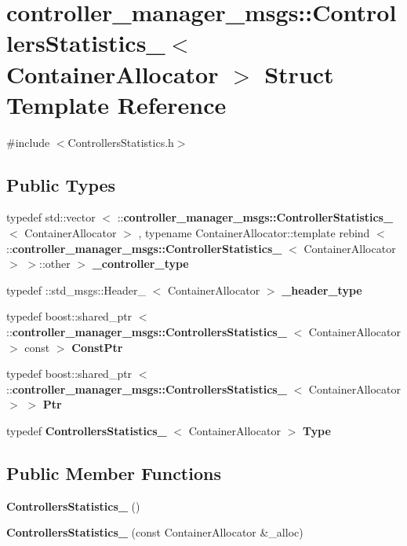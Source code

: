 \section{controller\-\_\-manager\-\_\-msgs\-:\-:\-Controllers\-Statistics\-\_\-$<$ \-Container\-Allocator $>$ \-Struct \-Template \-Reference}
\label{structcontroller__manager__msgs_1_1ControllersStatistics__}


{\ttfamily \#include $<$\-Controllers\-Statistics.\-h$>$}

\subsection*{\-Public \-Types}
\begin{DoxyCompactItemize}
\item 
typedef std\-::vector\*
$<$ \-::{\bf controller\-\_\-manager\-\_\-msgs\-::\-Controller\-Statistics\-\_\-}\*
$<$ \-Container\-Allocator $>$\*
, typename \*
\-Container\-Allocator\-::template \*
rebind\*
$<$ \-::{\bf controller\-\_\-manager\-\_\-msgs\-::\-Controller\-Statistics\-\_\-}\*
$<$ \-Container\-Allocator $>$\*
 $>$\-::other $>$ {\bf \-\_\-controller\-\_\-type}
\item 
typedef \-::std\-\_\-msgs\-::\-Header\-\_\-\*
$<$ \-Container\-Allocator $>$ {\bf \-\_\-header\-\_\-type}
\item 
typedef boost\-::shared\-\_\-ptr\*
$<$ \-::{\bf controller\-\_\-manager\-\_\-msgs\-::\-Controllers\-Statistics\-\_\-}\*
$<$ \-Container\-Allocator $>$ const  $>$ {\bf \-Const\-Ptr}
\item 
typedef boost\-::shared\-\_\-ptr\*
$<$ \-::{\bf controller\-\_\-manager\-\_\-msgs\-::\-Controllers\-Statistics\-\_\-}\*
$<$ \-Container\-Allocator $>$ $>$ {\bf \-Ptr}
\item 
typedef {\bf \-Controllers\-Statistics\-\_\-}\*
$<$ \-Container\-Allocator $>$ {\bf \-Type}
\end{DoxyCompactItemize}
\subsection*{\-Public \-Member \-Functions}
\begin{DoxyCompactItemize}
\item 
{\bf \-Controllers\-Statistics\-\_\-} ()
\item 
{\bf \-Controllers\-Statistics\-\_\-} (const \-Container\-Allocator \&\-\_\-alloc)
\end{DoxyCompactItemize}
